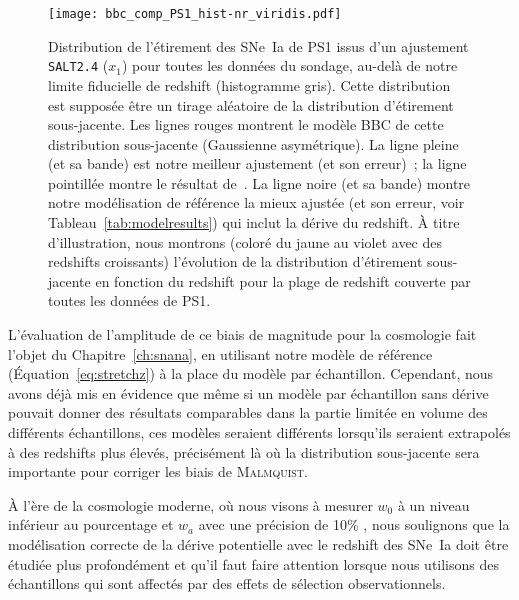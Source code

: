 \documentclass[../main/main.tex]{subfiles}
\begin{document}
\begin{figure}[ht]
    \centering
    \texttt{[image: bbc\_comp\_PS1\_hist-nr\_viridis.pdf]}

    \caption[Comparaison des modélisations de BBC et de notre modèle de
    référence sur l'histogramme des étirements de PS1]{Distribution de
        l'étirement des SNe~Ia de PS1 issus d'un ajustement \texttt{SALT2.4}
        ($x_1$) pour toutes les données du sondage, au-delà de notre limite
        fiducielle de redshift (histogramme gris). Cette distribution est
        supposée être un tirage aléatoire de la distribution d'étirement
        sous-jacente. Les lignes rouges montrent le modèle BBC de cette
        distribution sous-jacente (Gaussienne asymétrique). La ligne pleine (et
        sa bande) est notre meilleur ajustement (et son erreur)~; la ligne
        pointillée montre le résultat de~\cite{scolnic2018}. La ligne noire (et
        sa bande) montre notre modélisation de référence la mieux ajustée (et
        son erreur, voir Tableau~\ref{tab:modelresults}) qui inclut la dérive du
        redshift. À titre d'illustration, nous montrons (coloré du jaune au
        violet avec des redshifts croissants) l'évolution de la distribution
        d'étirement sous-jacente en fonction du redshift pour la plage de
    redshift couverte par toutes les données de PS1.}
    \label{fig:bbc_pdf_ps1}

\end{figure}

L'évaluation de l'amplitude de ce biais de magnitude pour la cosmologie fait
l'objet du Chapitre~\ref{ch:snana}, en utilisant notre modèle de référence
(Équation~\ref{eq:stretchz}) à la place du modèle par échantillon. Cependant,
nous avons déjà mis en évidence que même si un modèle par échantillon sans
dérive pouvait donner des résultats comparables dans la partie limitée en volume
des différents échantillons, ces modèles seraient différents lorsqu'ils
seraient extrapolés à des redshifts plus élevés, précisément là où la
distribution sous-jacente sera importante pour corriger les biais de
\textsc{Malmquist}.

À l'ère de la cosmologie moderne, où nous visons à mesurer $w_0$ à un niveau
inférieur au pourcentage et $w_a$ avec une précision de 10\% \citep[par
exemple,][]{ivezic2019}, nous soulignons que la modélisation correcte de la
dérive potentielle avec le redshift des SNe~Ia doit être étudiée plus
profondément et qu'il faut faire attention lorsque nous utilisons des
échantillons qui sont affectés par des effets de sélection observationnels.
\end{document}
